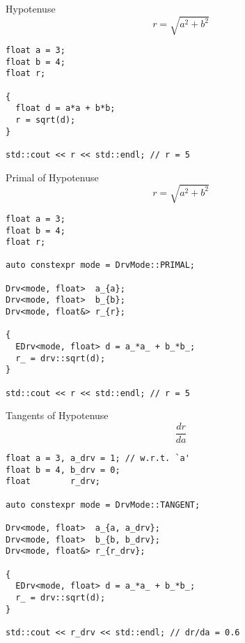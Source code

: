 \documentclass[xcolor=dvipsnames]{beamer}
\begin{document}
\begin{frame}[fragile]{Hypotenuse}
\begin{equation*}
  r = \sqrt{a^2 + b^2}
\end{equation*}

\begin{lstlisting}
float a = 3;
float b = 4;
float r;

{
  float d = a*a + b*b;
  r = sqrt(d);
}

std::cout << r << std::endl; // r = 5
\end{lstlisting}
\end{frame}


\begin{frame}[fragile]{Primal of Hypotenuse}
\begin{equation*}
  r = \sqrt{a^2 + b^2}
\end{equation*}

\begin{lstlisting}
float a = 3;
float b = 4;
float r;

auto constexpr mode = DrvMode::PRIMAL;

Drv<mode, float>  a_{a};
Drv<mode, float>  b_{b};
Drv<mode, float&> r_{r};

{
  EDrv<mode, float> d = a_*a_ + b_*b_;
  r_ = drv::sqrt(d);
}

std::cout << r << std::endl; // r = 5
\end{lstlisting}
\end{frame}


\begin{frame}[fragile]{Tangents of Hypotenuse}
\begin{equation*}
  \frac{d r}{d a}
\end{equation*}

\begin{lstlisting}
float a = 3, a_drv = 1; // w.r.t. `a'
float b = 4, b_drv = 0;
float        r_drv;

auto constexpr mode = DrvMode::TANGENT;

Drv<mode, float>  a_{a, a_drv};
Drv<mode, float>  b_{b, b_drv};
Drv<mode, float&> r_{r_drv};

{
  EDrv<mode, float> d = a_*a_ + b_*b_;
  r_ = drv::sqrt(d);
}

std::cout << r_drv << std::endl; // dr/da = 0.6
\end{lstlisting}
\end{frame}
\end{document}
